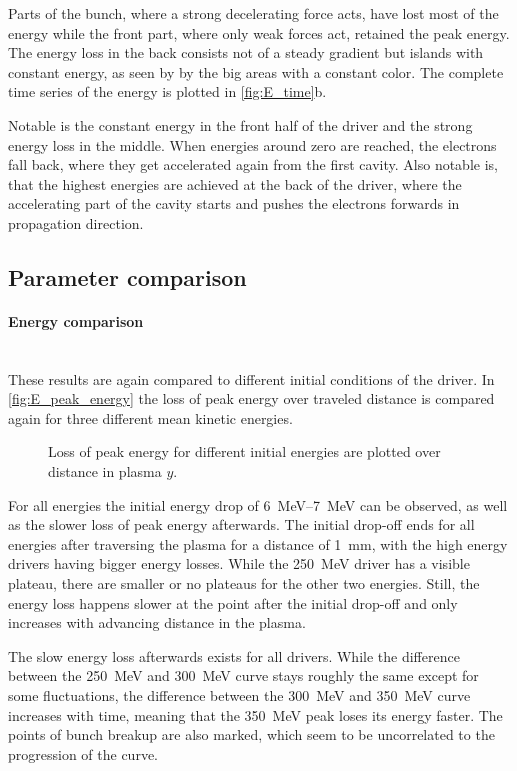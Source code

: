 \documentclass[bachelor_thesis]{subfiles}
\begin{document}
Parts of the bunch, where a strong decelerating force acts, have lost most of the energy while the front part, where only weak forces act, retained the peak energy. The energy loss in the back consists not of a steady gradient but islands with constant energy, as seen by by the big areas with a constant color.
The complete time series of the energy is plotted in \autoref{fig:E_time}b.

Notable is the constant energy in the front half of the driver and the strong energy loss in the middle. When energies around zero are reached, the electrons fall back, where they get accelerated again from the first cavity.
Also notable is, that the highest energies are achieved at the back of the driver, where the accelerating part of the cavity starts and pushes the electrons forwards in propagation direction.

\subsection{Parameter comparison}
\paragraph*{Energy comparison}\hspace{0pt} \\
These results are again compared to different initial conditions of the driver. In \autoref{fig:E_peak_energy} the loss of peak energy over traveled distance is compared again for three different mean kinetic energies.
\begin{figure}
	\centering
	
	\caption{Loss of peak energy for different initial energies are plotted over distance in plasma $y$.}
	\label{fig:E_peak_energy}
\end{figure}

For all energies the initial energy drop of \qtyrange{6}{7}{\MeV} can be observed, as well as the slower loss of peak energy afterwards. The initial drop-off ends for all energies after traversing the plasma for a distance of \qty{1}{\mm}, with the high energy drivers having bigger energy losses. 
While the \qty{250}{\MeV} driver has a visible plateau, there are smaller or no plateaus for the other two energies. Still, the energy loss happens slower at the point after the initial drop-off and only increases with advancing distance in the plasma.

The slow energy loss afterwards exists for all drivers. While the difference between the \qty{250}{\MeV} and \qty{300}{\MeV} curve stays roughly the same except for some fluctuations, 
the difference between the \qty{300}{\MeV} and \qty{350}{\MeV} curve increases with time, meaning that the \qty{350}{\MeV} peak loses its energy faster. The points of bunch breakup are also marked, which seem to be uncorrelated to the progression of the curve.
\end{document}
